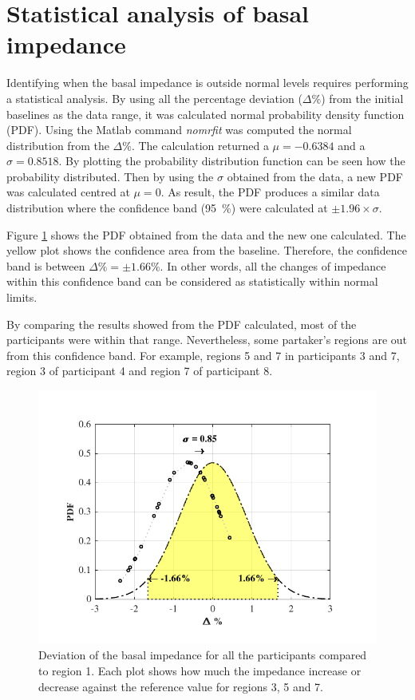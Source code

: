 \section{Statistical analysis of basal impedance}
\label{senction basal 4} 
Identifying when the basal impedance is outside normal levels requires performing a statistical analysis. By using all the percentage deviation ($\Delta \%$) from the initial baselines as the data range, it was calculated normal probability density function (PDF). Using the Matlab command \textit{nomrfit} was computed the normal distribution from the $\Delta \%$. The calculation returned a $\mu = -0.6384$ and a $\sigma = 0.8518$. By plotting the probability distribution function can be seen how the probability distributed. Then by using the $\sigma$ obtained from the data, a new PDF was calculated centred at $\mu = 0$. As result, the PDF produces a similar data distribution where the confidence band (\SI{95}{\percent}) were calculated at $\pm 1.96 \times\sigma$.

Figure \ref{fig:basal pdf} shows the PDF obtained from the data and the new one calculated. The yellow plot shows the confidence area from the baseline. Therefore, the confidence band is between $\Delta \% = \pm 1.66 \%$. In other words, all the changes of impedance within this confidence band can be considered as statistically within normal limits. 

By comparing the results showed from the PDF calculated, most of the participants were within that range. Nevertheless, some partaker's regions are out from this confidence band. For example, regions 5 and 7 in participants 3 and 7, region 3 of participant 4 and region 7 of participant 8.

\begin{figure}[!htbp]  %
	\centering
	\includegraphics[width=12cm,keepaspectratio, trim={0cm 0cm 0cm 0cm},clip]{figure_b_5}    
	\caption[Percentil change of baseline imepdance]{Deviation of the basal impedance for all the participants compared to region 1. Each plot shows how much the impedance increase or decrease against the reference value for regions 3, 5 and 7. }
	\label{fig:basal pdf} 
\end{figure}


